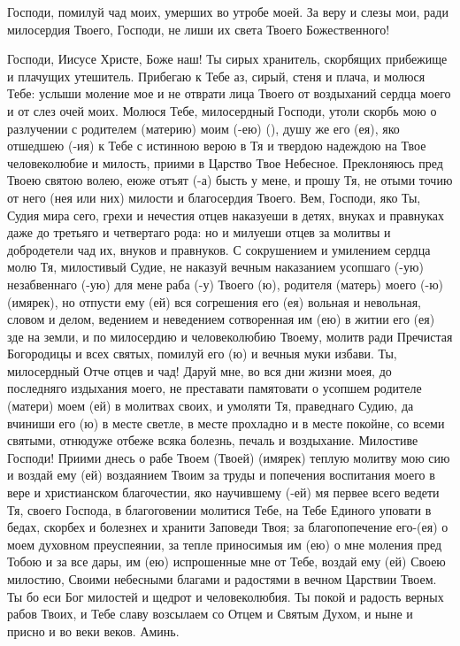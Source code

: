 \mychapterending{}

 

Господи, помилуй чад моих, умерших во утробе моей. За веру и слезы мои, ради милосердия Твоего, Господи, не лиши их света Твоего Божественного! 

\mychapterending

\begin{mymulticols}
 

Господи, Иисусе Христе, Боже наш! Ты сирых хранитель, скорбящих прибежище и плачущих утешитель. Прибегаю к Тебе аз, сирый, стеня и плача, и молюся Тебе: услыши моление мое и не отврати лица Твоего от воздыханий сердца моего и от слез очей моих. Молюся Тебе, милосердный Господи, утоли скорбь мою о разлучении с родителем (материю) моим (-ею) (), душу же его (ея), яко отшедшею (-ия) к Тебе с истинною верою в Тя и твердою надеждою на Твое человеколюбие и милость, приими в Царство Твое Небесное. Преклоняюсь пред Твоею святою волею, еюже отъят (-а) бысть у мене, и прошу Тя, не отыми точию от него (нея или них) милости и благосердия Твоего. Вем, Господи, яко Ты, Судия мира сего, грехи и нечестия отцев наказуеши в детях, внуках и правнуках даже до третьяго и четвертаго рода: но и милуеши отцев за молитвы и добродетели чад их, внуков и правнуков. С сокрушением и умилением сердца молю Тя, милостивый Судие, не наказуй вечным наказанием усопшаго (-ую) незабвеннаго (-ую) для мене раба (-у) Твоего (ю), родителя (матерь) моего (-ю) (имярек), но отпусти ему (ей) вся согрешения его (ея) вольная и невольная, словом и делом, ведением и неведением сотворенная им (ею) в житии его (ея) зде на земли, и по милосердию и человеколюбию Твоему, молитв ради Пречистая Богородицы и всех святых, помилуй его (ю) и вечныя муки избави. Ты, милосердный Отче отцев и чад! Даруй мне, во вся дни жизни моея, до последняго издыхания моего, не преставати памятовати о усопшем родителе (матери) моем (ей) в молитвах своих, и умоляти Тя, праведнаго Судию, да вчиниши его (ю) в месте светле, в месте прохладно и в месте покойне, со всеми святыми, отнюдуже отбеже всяка болезнь, печаль и воздыхание. Милостиве Господи! Приими днесь о рабе Твоем (Твоей) (имярек) теплую молитву мою сию и воздай ему (ей) воздаянием Твоим за труды и попечения воспитания моего в вере и христианском благочестии, яко научившему (-ей) мя первее всего ведети Тя, своего Господа, в благоговении молитися Тебе, на Тебе Единого уповати в бедах, скорбех и болезнех и хранити Заповеди Твоя; за благопопечение его-(ея) о моем духовном преуспеянии, за тепле приносимыя им (ею) о мне моления пред Тобою и за все дары, им (ею) испрошенные мне от Тебе, воздай ему (ей) Своею милостию, Своими небесными благами и радостями в вечном Царствии Твоем. Ты бо еси Бог милостей и щедрот и человеколюбия. Ты покой и радость верных рабов Твоих, и Тебе славу возсылаем со Отцем и Святым Духом, и ныне и присно и во веки веков. Аминь. 

\end{mymulticols}

